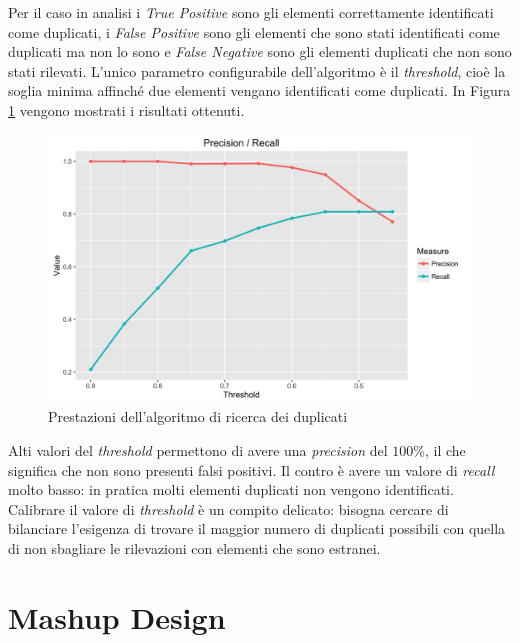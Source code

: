 Per il caso in analisi i \emph{True Positive} sono gli elementi correttamente identificati come duplicati, i \emph{False Positive} sono gli elementi che sono stati identificati come duplicati ma non lo sono e \emph{False Negative} sono gli elementi duplicati che non sono stati rilevati. L'unico parametro configurabile dell'algoritmo è il \emph{threshold}, cioè la soglia minima affinché due elementi vengano identificati come duplicati. In Figura \ref{fig:prestazioni-algoritmo-duplicati} vengono mostrati i risultati ottenuti.

\begin{figure}[ht]
	\centering
	\includegraphics[width=\textwidth]{3-metodologia-camus/Immagini/similarity_precision_recall.png}
	\caption{Prestazioni dell'algoritmo di ricerca dei duplicati}\label{fig:prestazioni-algoritmo-duplicati}
\end{figure}

Alti valori del \emph{threshold} permettono di avere una \emph{precision} del $ 100\% $, il che significa che non sono presenti falsi positivi. Il contro è avere un valore di \emph{recall} molto basso: in pratica molti elementi duplicati non vengono identificati. Calibrare il valore di \emph{threshold} è un compito delicato: bisogna cercare di bilanciare l'esigenza di trovare il maggior numero di duplicati possibili con quella di non sbagliare le rilevazioni con elementi che sono estranei.

\section{Mashup Design\label{sec:mashup-design}}

